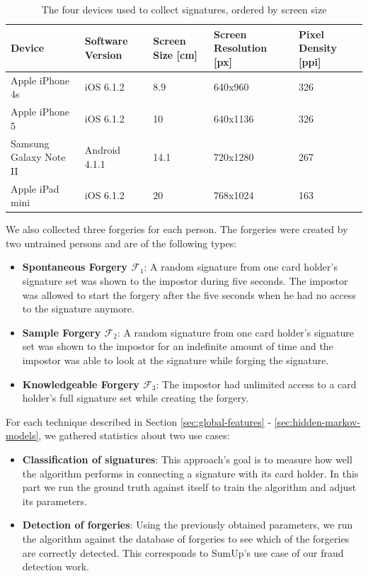 \documentclass[a4paper, oneside]{csthesis}
\begin{document}
\begin{table}[tb]
    \begin{center}
        \begin{tabular}{p{1.75cm}|p{2cm}p{2cm}p{2cm}p{2cm}}
        \hline

        \hline
        \textbf{Device} & \textbf{Software Version} & \textbf{Screen Size [cm]} & \textbf{Screen Resolution [px]} & \textbf{Pixel Density [ppi]} \\
        \hline
        Apple iPhone 4s & iOS 6.1.2 & 8.9 & 640x960 & 326 \\
        \hdashline[0.5pt/3pt]
        Apple iPhone 5 & iOS 6.1.2 & 10 & 640x1136 & 326 \\
        \hdashline[0.5pt/3pt]
        Samsung Galaxy Note II & Android 4.1.1 & 14.1 & 720x1280 & 267 \\
        \hdashline[0.5pt/3pt]
        Apple iPad mini & iOS 6.1.2 & 20 & 768x1024 & 163\\
        \hline
        \end{tabular}
    \end{center}
    \caption{The four devices used to collect signatures, ordered by screen size}
    \label{tbl:signatures-devices}
\end{table}

We also collected three forgeries for each person. The forgeries were created by two untrained persons and are of the following types:

\begin{itemize}
\item \textbf{Spontaneous Forgery $\mathcal{F}_1$}: A random signature from one card holder's  signature set was shown to the impostor during five seconds. The impostor was allowed to start the forgery after the five seconds when he had no access to the signature anymore.
\item \textbf{Sample Forgery $\mathcal{F}_2$}: A random signature from one card holder's signature set was shown to the impostor for an indefinite amount of time and the impostor was able to look at the signature while forging the signature.
\item \textbf{Knowledgeable Forgery $\mathcal{F}_3$}: The impostor had unlimited access to a card holder's full signature set while creating the forgery.
\end{itemize}


For each technique described in Section \ref{sec:global-features} - \ref{sec:hidden-markov-models}, we gathered statistics about two use cases:
\begin{itemize}
\item \textbf{Classification of signatures}: This approach's goal is to measure how well the algorithm performs in connecting a signature with its card holder. In this part we run the ground truth against itself to train the algorithm and adjust its parameters.
\item \textbf{Detection of forgeries}: Using the previously obtained parameters, we run the algorithm against the database of forgeries to see which of the forgeries are correctly detected. This corresponds to SumUp's use case of our fraud detection work.
\end{itemize}
\end{document}
